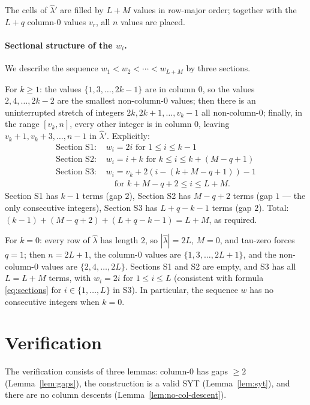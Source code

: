 \documentclass[11pt]{article}
\theoremstyle{definition}
\newcommand{\hatl}{\widehat\lambda}
\begin{document}
The cells of $\hatl'$ are filled by $L+M$ values in row-major order;
together with the $L+q$ column-$0$ values $v_r$, all $n$ values are
placed.

\paragraph{Sectional structure of the $w_i$.}  We describe the
sequence $w_1 < w_2 < \cdots < w_{L+M}$ by three sections.

For $k \ge 1$: the values $\{1, 3, \ldots, 2k-1\}$ are in column $0$,
so the values $2, 4, \ldots, 2k-2$ are the smallest non-column-$0$
values; then there is an uninterrupted stretch of integers
$2k, 2k+1, \ldots, v_k - 1$ all non-column-$0$; finally, in the range
$[v_k, n]$, every other integer is in column $0$, leaving
$v_k + 1, v_k + 3, \ldots, n-1$ in $\hatl'$.  Explicitly:
\begin{equation}\label{eq:sections}
\begin{aligned}
\text{Section S1: }& w_i = 2i \text{ for } 1 \le i \le k-1\\
\text{Section S2: }& w_i = i + k \text{ for } k \le i \le k + (M - q + 1)\\
\text{Section S3: }& w_i = v_k + 2(i - (k + M - q + 1)) - 1\\
   & \quad\text{for } k + M - q + 2 \le i \le L + M.
\end{aligned}
\end{equation}
Section S1 has $k-1$ terms (gap $2$), Section S2 has $M-q+2$ terms
(gap $1$ --- the only consecutive integers), Section S3 has
$L+q-k-1$ terms (gap $2$).  Total: $(k-1) + (M-q+2) + (L+q-k-1) =
L + M$, as required.

For $k = 0$: every row of $\hatl$ has length $2$, so $|\hatl| = 2L$,
$M = 0$, and tau-zero forces $q = 1$; then $n = 2L+1$, the
column-$0$ values are $\{1, 3, \ldots, 2L+1\}$, and the non-column-$0$
values are $\{2, 4, \ldots, 2L\}$.  Sections S1 and S2 are empty, and
S3 has all $L = L+M$ terms, with $w_i = 2i$ for $1 \le i \le L$
(consistent with formula \eqref{eq:sections} for $i \in \{1, \ldots,
L\}$ in S3).  In particular, the sequence $w$ has no consecutive
integers when $k = 0$.

\section{Verification}\label{sec:verification}

The verification consists of three lemmas:
column-$0$ has gaps $\ge 2$ (Lemma~\ref{lem:gaps}), the construction
is a valid SYT (Lemma~\ref{lem:syt}), and there are no column
descents (Lemma~\ref{lem:no-col-descent}).
\end{document}
